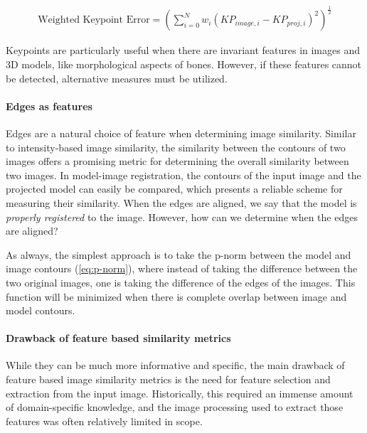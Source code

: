 \begin{equation}
    \begin{aligned}
        \text{Weighted Keypoint Error} = (\sum_{i = 0}^{N}w_{i}(KP_{image,i} - KP_{proj,i})^2)^{\frac{1}{2}}
    \end{aligned}
    \label{eq:wkp-error}
\end{equation}

Keypoints are particularly useful when there are invariant features in images and 3D models, like morphological aspects of bones.
However, if these features cannot be detected, alternative measures must be utilized.

\paragraph*{Edges as features}
Edges are a natural choice of feature when determining image similarity.
Similar to intensity-based image similarity, the similarity between the contours of two images offers a promising metric for determining the overall similarity between two images.
In model-image registration, the contours of the input image and the projected model can easily be compared, which presents a reliable scheme for measuring their similarity.
When the edges are aligned, we say that the model is \textit{properly registered} to the image.
However, how can we determine when the edges are aligned?

As always, the simplest approach is to take the p-norm between the model and image contours (\cref{eq:p-norm}), where instead of taking the difference between the two original images, one is taking the difference of the edges of the images.
This function will be minimized when there is complete overlap between image and model contours.

\paragraph{Drawback of feature based similarity metrics}
While they can be much more informative and specific, the main drawback of feature based image similarity metrics is the need for feature selection and extraction from the input image.
Historically, this required an immense amount of domain-specific knowledge, and the image processing used to extract those features was often relatively limited in scope.


